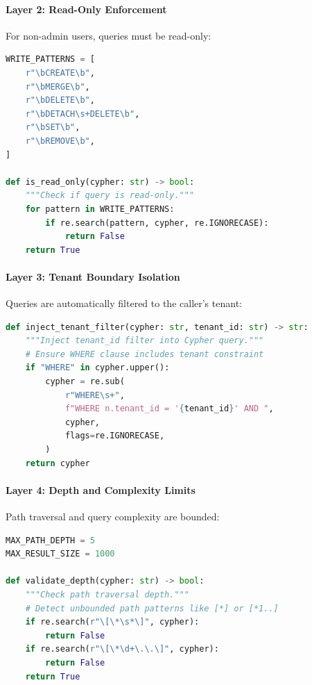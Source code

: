 \paragraph{Layer 2: Read-Only Enforcement} For non-admin users, queries must be read-only:

\begin{lstlisting}[language=Python, caption={Write operation detection}, label=lst:write-detection]
WRITE_PATTERNS = [
    r"\bCREATE\b",
    r"\bMERGE\b",
    r"\bDELETE\b",
    r"\bDETACH\s+DELETE\b",
    r"\bSET\b",
    r"\bREMOVE\b",
]

def is_read_only(cypher: str) -> bool:
    """Check if query is read-only."""
    for pattern in WRITE_PATTERNS:
        if re.search(pattern, cypher, re.IGNORECASE):
            return False
    return True
\end{lstlisting}

\paragraph{Layer 3: Tenant Boundary Isolation} Queries are automatically filtered to the caller's tenant:

\begin{lstlisting}[language=Python, caption={Tenant filtering}, label=lst:tenant-filter]
def inject_tenant_filter(cypher: str, tenant_id: str) -> str:
    """Inject tenant_id filter into Cypher query."""
    # Ensure WHERE clause includes tenant constraint
    if "WHERE" in cypher.upper():
        cypher = re.sub(
            r"WHERE\s+",
            f"WHERE n.tenant_id = '{tenant_id}' AND ",
            cypher,
            flags=re.IGNORECASE,
        )
    return cypher
\end{lstlisting}

\paragraph{Layer 4: Depth and Complexity Limits} Path traversal and query complexity are bounded:

\begin{lstlisting}[language=Python, caption={Depth limit enforcement}, label=lst:depth-limits]
MAX_PATH_DEPTH = 5
MAX_RESULT_SIZE = 1000

def validate_depth(cypher: str) -> bool:
    """Check path traversal depth."""
    # Detect unbounded path patterns like [*] or [*1..]
    if re.search(r"\[\*\s*\]", cypher):
        return False
    if re.search(r"\[\*\d+\.\.\]", cypher):
        return False
    return True
\end{lstlisting}

